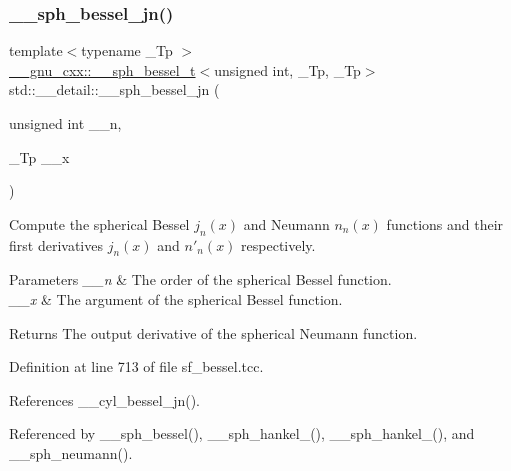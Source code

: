 \subsubsection{\texorpdfstring{\+\_\+\+\_\+sph\+\_\+bessel\+\_\+jn()}{\_\_sph\_bessel\_jn()}}
{\footnotesize\ttfamily template$<$typename \+\_\+\+Tp $>$ \\
\hyperlink{struct____gnu__cxx_1_1____sph__bessel__t}{\+\_\+\+\_\+gnu\+\_\+cxx\+::\+\_\+\+\_\+sph\+\_\+bessel\+\_\+t}$<$unsigned int, \+\_\+\+Tp, \+\_\+\+Tp$>$ std\+::\+\_\+\+\_\+detail\+::\+\_\+\+\_\+sph\+\_\+bessel\+\_\+jn (\begin{DoxyParamCaption}\item[{unsigned int}]{\+\_\+\+\_\+n,  }\item[{\+\_\+\+Tp}]{\+\_\+\+\_\+x }\end{DoxyParamCaption})}



Compute the spherical Bessel $ j_n(x) $ and Neumann $ n_n(x) $ functions and their first derivatives $ j_n(x) $ and $ n'_n(x) $ respectively. 


\begin{DoxyParams}{Parameters}
{\em \+\_\+\+\_\+n} & The order of the spherical Bessel function. \\
\hline
{\em \+\_\+\+\_\+x} & The argument of the spherical Bessel function. \\
\hline
\end{DoxyParams}
\begin{DoxyReturn}{Returns}
The output derivative of the spherical Neumann function. 
\end{DoxyReturn}


Definition at line 713 of file sf\+\_\+bessel.\+tcc.



References \+\_\+\+\_\+cyl\+\_\+bessel\+\_\+jn().



Referenced by \+\_\+\+\_\+sph\+\_\+bessel(), \+\_\+\+\_\+sph\+\_\+hankel\+\_(), \+\_\+\+\_\+sph\+\_\+hankel\+\_(), and \+\_\+\+\_\+sph\+\_\+neumann().

\mbox{\label{namespacestd_1_1____detail_a8c2a1782e4030a517568aaebecb09f9d}} 
